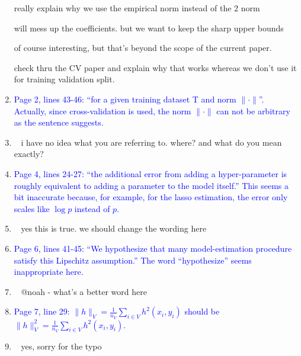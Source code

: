 \documentclass[]{article}
\newcommand{\point}[1]{\item \textcolor{blue}{#1}}
\newcommand{\reply}{\item[]\ }
\begin{document}
\begin{enumerate}
{			really explain why we use the empirical norm instead of the 2 norm
			
			will mess up the coefficients. but we want to keep the sharp upper bounds
			
			of course interesting, but that's beyond the scope of the current paper.
			
			check thru the CV paper and explain why that works whereas we don't use it for training validation split.
		}

		\point{
			Page 2, lines 43-46: “for a given training dataset T and norm $\|\cdot \|$”. Actually, since cross-validation is used, the norm $\|\cdot \|$ can not be arbitrary as the sentence suggests.
		}

		\reply{
			i have no idea what you are referring to. where? and what do you mean exactly?
		}

		\point{
			Page 4, lines 24-27: “the additional error from adding a hyper-parameter is roughly equivalent to adding a parameter to the model itself.” This seems a bit inaccurate because, for example, for the lasso estimation, the error only scales like $\log p$ instead of $p$.
		}

		\reply {
			yes this is true. we should change the wording here
		}

		\point{
		Page 6, lines 41-45: “We hypothesize that many model-estimation procedure satisfy this Lipschitz assumption.” The word “hypothesize” seems inappropriate here.
		}

		\reply{
			@noah - what's a better word here
		}
	
		\point{
			Page 7, line 29: $\|h\|_V = \frac{1}{n_V} \sum_{i \in V} h^2(x_i, y_i)$ should be $\|h\|_V^2 = \frac{1}{n_V} \sum_{i \in V} h^2(x_i, y_i).$
		}
	
		\reply{
			yes, sorry for the typo
		}
	
		\end{enumerate} 
	
\end{document}
